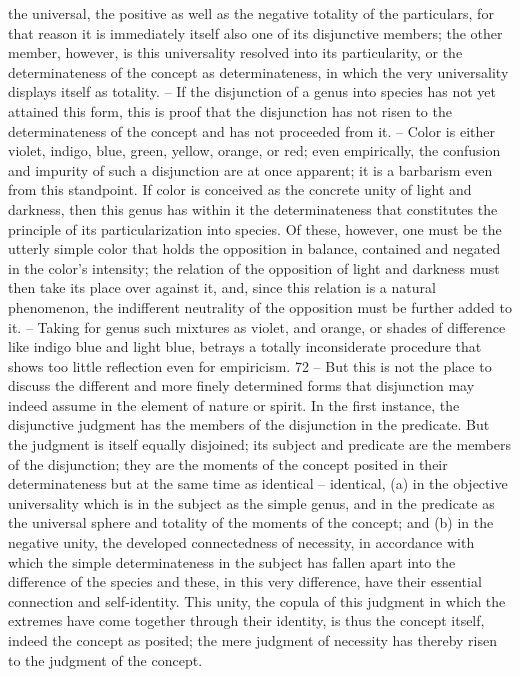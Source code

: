 the universal, the positive as well as the negative totality of the particulars,
for that reason it is immediately itself also one of its disjunctive members; the
other member, however, is this universality resolved into its particularity, or
the determinateness of the concept as determinateness, in which the very
universality displays itself as totality. – If the disjunction of a genus into
species has not yet attained this form, this is proof that the disjunction has
not risen to the determinateness of the concept and has not proceeded from
it. – Color is either violet, indigo, blue, green, yellow, orange, or red; even
empirically, the confusion and impurity of such a disjunction are at once
apparent; it is a barbarism even from this standpoint. If color is conceived
as the concrete unity of light and darkness, then this genus has within it the
determinateness that constitutes the principle of its particularization into
species. Of these, however, one must be the utterly simple color that holds
the opposition in balance, contained and negated in the color's intensity;
the relation of the opposition of light and darkness must then take its
place over against it, and, since this relation is a natural phenomenon,
the indifferent neutrality of the opposition must be further added to it. –
Taking for genus such mixtures as violet, and orange, or shades of difference
like indigo blue and light blue, betrays a totally inconsiderate procedure
that shows too little reflection even for empiricism. 72 – But this is not
the place to discuss the different and more finely determined forms that
disjunction may indeed assume in the element of nature or spirit.
In the first instance, the disjunctive judgment has the members of the
disjunction in the predicate. But the judgment is itself equally disjoined;
its subject and predicate are the members of the disjunction; they are the
moments of the concept posited in their determinateness but at the same
time as identical – identical, (a) in the objective universality which is in
the subject as the simple genus, and in the predicate as the universal sphere
and totality of the moments of the concept; and (b) in the negative unity,
the developed connectedness of necessity, in accordance with which the
simple determinateness in the subject has fallen apart into the difference of
the species and these, in this very difference, have their essential connection
and self-identity.
This unity, the copula of this judgment in which the extremes have
come together through their identity, is thus the concept itself, indeed the
concept as posited; the mere judgment of necessity has thereby risen to the
judgment of the concept.

